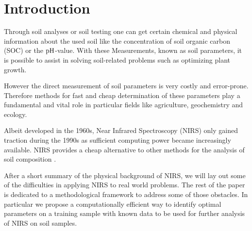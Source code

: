 \section{Introduction}
\label{sec:introduction}
	
	Through soil analyses or soil testing one can get certain chemical and physical information about the used soil like the concentration of soil organic carbon (SOC) or the $\mathrm{pH}$-value.
	With these Measurements, known as soil parameters, it is possible to assist in solving soil-related problems such as optimizing plant growth.
	
	However the direct measurement of soil parameters is very costly and error-prone.
	Therefore methods for fast and cheap determination of these parameters play a fundamental and vital role in particular fields like agriculture, geochemistry and ecology.

	Albeit developed in the 1960s, Near Infrared Spectroscopy (NIRS) only gained traction during the 1990s as sufficient computing power became increasingly available.
	NIRS provides a cheap alternative to other methods for the analysis of soil composition %
	.

	After a short summary of the physical background of NIRS, we will lay out some of the difficulties in applying NIRS to real world problems.
	The rest of the paper is dedicated to a methodological framework to address some of those obstacles.
	In particular we propose a computationally efficient way to identify %
	optimal parameters on a training sample with known data to be used for further analysis of NIRS on soil samples.

